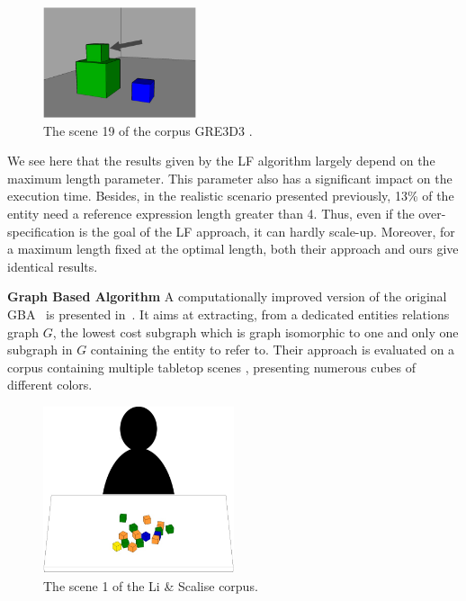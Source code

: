\documentclass[a4paper,11pt,twoside]{StyleThese}
\begin{document}
\begin{figure}[hbtp]
\centering
\includegraphics[width=0.4\textwidth]{figures/chapter3/GRE3D319.jpg}
\caption{The scene 19 of the corpus GRE3D3 \cite{viethen2013graphs}.}
\label{fig:gre3d3}
\end{figure}

We see here that the results given by the LF algorithm largely depend on the maximum length parameter. This parameter also has a significant impact on the execution time. Besides, in the realistic scenario presented previously, 13\% of the entity need a reference expression length greater than 4. Thus, even if the over-specification is the goal of the LF approach, it can hardly scale-up. Moreover, for a maximum length fixed at the optimal length, both their approach and ours give identical results.

\textbf{Graph Based Algorithm}
A computationally improved version of the original GBA~\cite{viethen2013graphs} is presented in~\cite{li2017automatically}. It aims at extracting, from a dedicated entities relations graph $G$, the lowest cost subgraph which is graph isomorphic to one and only one subgraph in $G$ containing the entity to refer to.
Their approach is evaluated on a corpus containing multiple tabletop scenes \cite{scalise2018natural}, presenting numerous cubes of different colors.

\begin{figure}[hbtp]
\centering
\includegraphics[width=0.5\textwidth]{figures/chapter3/liscene1.png}
\caption{The scene 1 of the Li \& Scalise corpus.}
\label{fig:gbacorpus}
\end{figure}
\end{document}
